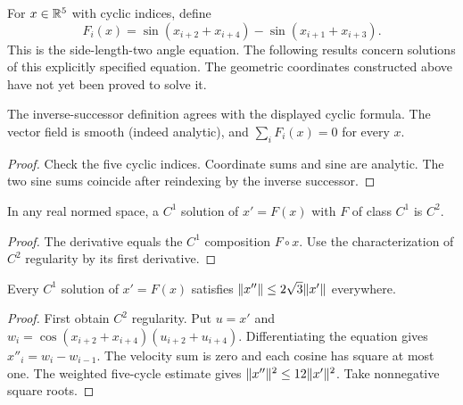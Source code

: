 \begin{definition}
\label{def:pentagon-angle-field}
\leanok
For $x\in\mathbb{R}^5$ with cyclic indices, define
\[
 F_i(x)=\sin(x_{i+2}+x_{i+4})-\sin(x_{i+1}+x_{i+3}).
\]
This is the side-length-two angle equation. The following results concern
solutions of this explicitly specified equation. The geometric coordinates
constructed above have not yet been proved to solve it.
\end{definition}

\begin{lemma}
\label{lem:pentagon-field-api}
\leanok
{}
The inverse-successor definition agrees with the displayed cyclic formula.
The vector field is smooth (indeed analytic), and $\sum_iF_i(x)=0$ for every $x$.
\end{lemma}
\begin{proof}
\leanok
Check the five cyclic indices. Coordinate sums and sine are analytic.
The two sine sums coincide after reindexing by the inverse successor.
\end{proof}

\begin{lemma}
\label{lem:ode-regularity}
\leanok
In any real normed space, a $C^1$ solution of $x'=F(x)$ with $F$ of class
$C^1$ is $C^2$.
\end{lemma}
\begin{proof}
\leanok
The derivative equals the $C^1$ composition $F\circ x$.
Use the characterization of $C^2$ regularity by its first derivative.
\end{proof}

\begin{proposition}
\label{prop:pentagon-acceleration}
\leanok
{}
Every $C^1$ solution of $x'=F(x)$ satisfies
$\lVert x''\rVert\leq2\sqrt3\lVert x'\rVert$ everywhere.
\end{proposition}
\begin{proof}
\leanok
First obtain $C^2$ regularity. Put $u=x'$ and
$w_i=\cos(x_{i+2}+x_{i+4})(u_{i+2}+u_{i+4})$.
Differentiating the equation gives $x''_i=w_i-w_{i-1}$.
The velocity sum is zero and each cosine has square at most one.
The weighted five-cycle estimate gives $\lVert x''\rVert^2\leq12\lVert x'\rVert^2$.
Take nonnegative square roots.
\end{proof}

